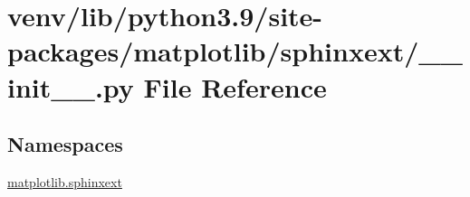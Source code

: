 \hypertarget{venv_2lib_2python3_89_2site-packages_2matplotlib_2sphinxext_2____init_____8py}{}\section{venv/lib/python3.9/site-\/packages/matplotlib/sphinxext/\+\_\+\+\_\+init\+\_\+\+\_\+.py File Reference}
\label{venv_2lib_2python3_89_2site-packages_2matplotlib_2sphinxext_2____init_____8py}
\subsection*{Namespaces}
\begin{DoxyCompactItemize}
\item 
 \hyperlink{namespacematplotlib_1_1sphinxext}{matplotlib.\+sphinxext}
\end{DoxyCompactItemize}
